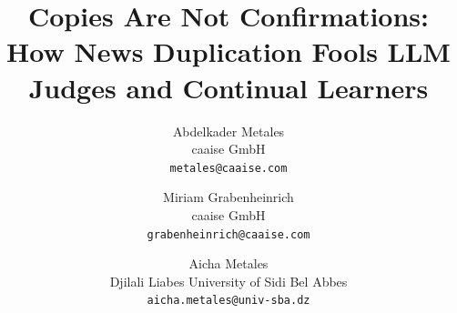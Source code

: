 \documentclass[11pt]{article}
\title{Copies Are Not Confirmations:\\How News Duplication Fools LLM Judges and Continual Learners}
\author{
  Abdelkader Metales\\
  caaise GmbH\\
  \texttt{metales@caaise.com}
  \and
  Miriam Grabenheinrich\\
  caaise GmbH\\
  \texttt{grabenheinrich@caaise.com}
  \and
  Aicha Metales\\
  Djilali Liabes University of Sidi Bel Abbes\\
  \texttt{aicha.metales@univ-sba.dz}
}
\date{}
\begin{document}
\maketitle

\begin{abstract}

\end{abstract}







\end{document}

